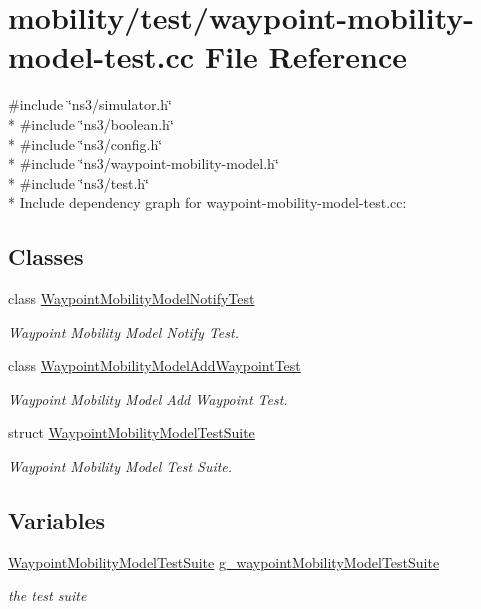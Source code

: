 \hypertarget{waypoint-mobility-model-test_8cc}{}\section{mobility/test/waypoint-\/mobility-\/model-\/test.cc File Reference}
\label{waypoint-mobility-model-test_8cc}
{\ttfamily \#include \char`\"{}ns3/simulator.\+h\char`\"{}}\\*
{\ttfamily \#include \char`\"{}ns3/boolean.\+h\char`\"{}}\\*
{\ttfamily \#include \char`\"{}ns3/config.\+h\char`\"{}}\\*
{\ttfamily \#include \char`\"{}ns3/waypoint-\/mobility-\/model.\+h\char`\"{}}\\*
{\ttfamily \#include \char`\"{}ns3/test.\+h\char`\"{}}\\*
Include dependency graph for waypoint-\/mobility-\/model-\/test.cc\+:
\subsection*{Classes}
\begin{DoxyCompactItemize}
\item 
class \hyperlink{classWaypointMobilityModelNotifyTest}{Waypoint\+Mobility\+Model\+Notify\+Test}
\begin{DoxyCompactList}\small\item\em Waypoint Mobility Model Notify Test. \end{DoxyCompactList}\item 
class \hyperlink{classWaypointMobilityModelAddWaypointTest}{Waypoint\+Mobility\+Model\+Add\+Waypoint\+Test}
\begin{DoxyCompactList}\small\item\em Waypoint Mobility Model Add Waypoint Test. \end{DoxyCompactList}\item 
struct \hyperlink{structWaypointMobilityModelTestSuite}{Waypoint\+Mobility\+Model\+Test\+Suite}
\begin{DoxyCompactList}\small\item\em Waypoint Mobility Model Test Suite. \end{DoxyCompactList}\end{DoxyCompactItemize}
\subsection*{Variables}
\begin{DoxyCompactItemize}
\item 
\hyperlink{structWaypointMobilityModelTestSuite}{Waypoint\+Mobility\+Model\+Test\+Suite} \hyperlink{group__mobility-test_ga98c7d90d165c941d567251f6ae314ea0}{g\+\_\+waypoint\+Mobility\+Model\+Test\+Suite}
\begin{DoxyCompactList}\small\item\em the test suite \end{DoxyCompactList}\end{DoxyCompactItemize}
